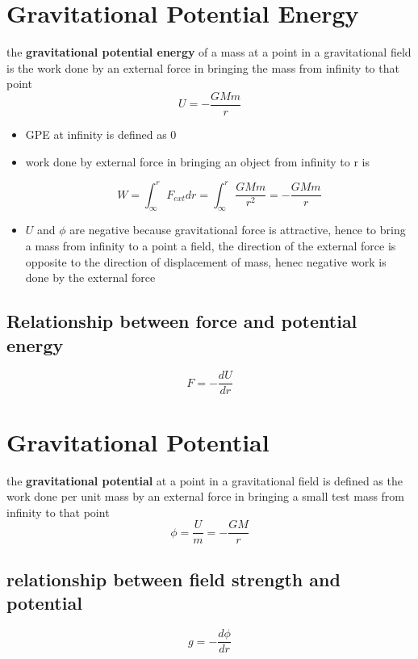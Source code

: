 \documentclass[a4paper, 10pt]{article}
\begin{document}
\section{Gravitational Potential Energy}
\begin{framed}
   the \textbf{gravitational potential energy} of a mass at a point in a gravitational field is the work done by an external force in bringing the mass from infinity to that point
   \[
   U = - \frac{GMm}{r}
   \]
\end{framed}	
\begin{itemize}
   \item GPE at infinity is defined as 0
   \item work done by external force in bringing an object from infinity to r is 

      \[
         W = \int_{\infty}^r F_{ext} dr = \int_{\infty}^{r} \frac{GMm}{r^2} = - \frac{GMm}{r}
      \]
   \item $U$ and $\phi$ are negative because gravitational force is attractive, hence to bring a mass from infinity to a point a field, the direction of the external force is opposite to the direction of displacement of mass, henec negative work is done by the external force
\end{itemize}	

\subsection{Relationship between force and potential energy}
\[
F = - \frac{dU}{dr}
\]

\section{Gravitational Potential}

\begin{framed}
   the \textbf{gravitational potential} at a point in a gravitational field is defined as the work done per unit mass by an external force in bringing a small test mass from infinity to that point
   \[
   \phi = \frac{U}{m} = - \frac{GM}{r}
   \]
   
\end{framed}	

\subsection{relationship between field strength and potential}
\[
g = - \frac{d\phi}{dr}  
\]
\end{document}
